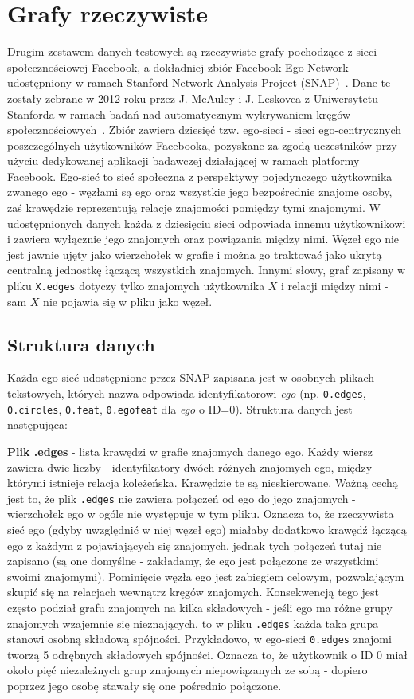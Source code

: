 \section{Grafy rzeczywiste}
Drugim zestawem danych testowych są rzeczywiste grafy pochodzące z sieci społecznościowej Facebook,
a dokładniej zbiór Facebook Ego Network udostępniony w ramach Stanford Network Analysis Project (SNAP)~\cite{snapnets}.
Dane te zostały zebrane w 2012 roku przez J. McAuley i J. Leskovca z Uniwersytetu Stanforda w ramach badań nad automatycznym wykrywaniem kręgów społecznościowych~\cite{McAuley2012}. Zbiór zawiera dziesięć tzw. ego-sieci - sieci ego-centrycznych poszczególnych użytkowników Facebooka, pozyskane za zgodą uczestników przy użyciu dedykowanej aplikacji badawczej działającej w ramach platformy Facebook. Ego-sieć to sieć społeczna z perspektywy pojedynczego użytkownika zwanego ego - węzłami są ego oraz wszystkie jego bezpośrednie znajome osoby, zaś krawędzie reprezentują relacje znajomości pomiędzy tymi znajomymi. W udostępnionych danych każda z dziesięciu sieci odpowiada innemu użytkownikowi i zawiera wyłącznie jego znajomych oraz powiązania między nimi. Węzeł ego nie jest jawnie ujęty jako wierzchołek w grafie i można go traktować jako ukrytą centralną jednostkę łączącą wszystkich znajomych. Innymi słowy, graf zapisany w pliku \verb|X.edges| dotyczy tylko znajomych użytkownika $X$ i relacji między nimi - sam $X$ nie pojawia się w pliku jako węzeł.

\subsection{Struktura danych}

Każda ego-sieć udostępnione przez SNAP zapisana jest w osobnych plikach tekstowych, których nazwa odpowiada identyfikatorowi \textit{ego} (np. \verb|0.edges|, \verb|0.circles|, \verb|0.feat|, \verb|0.egofeat| dla \textit{ego} o ID=0). Struktura danych jest następująca:

\textbf{Plik .edges} - lista krawędzi w grafie znajomych danego ego. Każdy wiersz zawiera dwie liczby - identyfikatory dwóch różnych znajomych ego, między którymi istnieje relacja koleżeńska. Krawędzie te są nieskierowane. Ważną cechą jest to, że plik \verb|.edges| nie zawiera połączeń od ego do jego znajomych - wierzchołek ego w ogóle nie występuje w tym pliku. Oznacza to, że rzeczywista sieć ego (gdyby uwzględnić w niej węzeł ego) miałaby dodatkowo krawędź łączącą ego z każdym z pojawiających się znajomych, jednak tych połączeń tutaj nie zapisano (są one domyślne - zakładamy, że ego jest połączone ze wszystkimi swoimi znajomymi). Pominięcie węzła ego jest zabiegiem celowym, pozwalającym skupić się na relacjach wewnątrz kręgów znajomych. Konsekwencją tego jest często podział grafu znajomych na kilka składowych - jeśli ego ma różne grupy znajomych wzajemnie się nieznających, to w pliku \verb|.edges| każda taka grupa stanowi osobną składową spójności. Przykładowo, w ego-sieci \verb|0.edges| znajomi tworzą 5 odrębnych składowych spójności. Oznacza to, że użytkownik o ID 0 miał około pięć niezależnych grup znajomych niepowiązanych ze sobą - dopiero poprzez jego osobę stawały się one pośrednio połączone.

